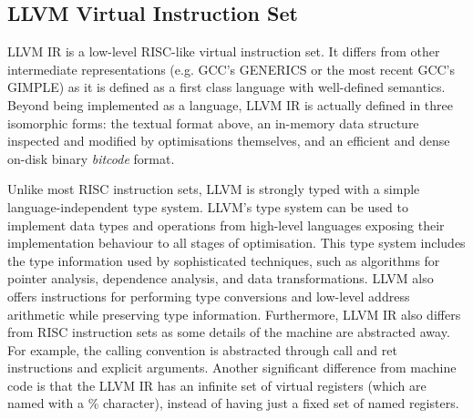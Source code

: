 


\subsection{LLVM Virtual Instruction Set}

LLVM IR is a low-level RISC-like virtual instruction set.
It differs from other intermediate representations (e.g. GCC's GENERICS or the most recent GCC's GIMPLE) as it is defined as a first class language with well-defined semantics.
Beyond being implemented as a language, LLVM IR is actually defined in three isomorphic forms: the textual format above, an in-memory data structure inspected and modified by optimisations themselves, and an efficient and dense on-disk binary \textit{bitcode} format.

Unlike most RISC instruction sets, LLVM is strongly typed with a simple language-independent type system.
LLVM's type system can be used to implement data types and operations from high-level languages exposing their implementation behaviour to all stages of optimisation.
This type system includes the type information used by sophisticated techniques, such as algorithms for pointer analysis, dependence analysis, and data transformations.
LLVM also offers instructions for performing type conversions and low-level address arithmetic while preserving type information.
Furthermore, LLVM IR also differs from RISC instruction sets as some details of the machine are abstracted away.
For example, the calling convention is abstracted through call and ret instructions and explicit arguments.
Another significant difference from machine code is that the LLVM IR has an infinite set of virtual registers (which are named with a \% character), instead of having just a fixed set of named registers.

